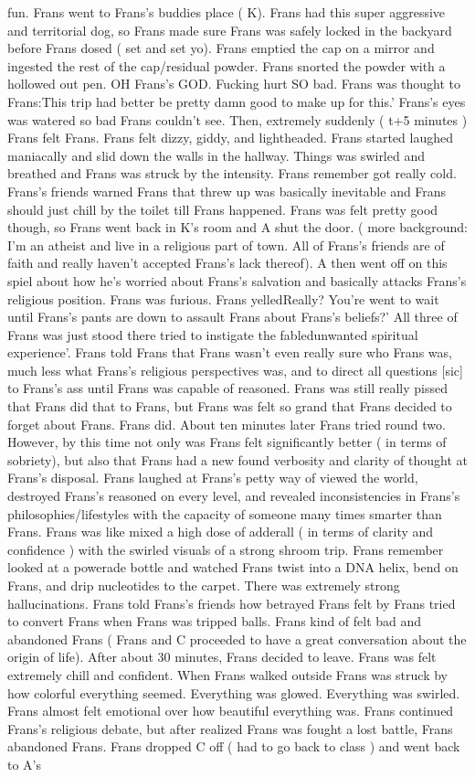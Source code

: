 \documentclass[12pt]{book}
\begin{document}
fun. Frans went to Frans's buddies place ( K). Frans had this super aggressive and territorial dog, so Frans made sure Frans was safely locked in the backyard before Frans dosed ( set and set yo). Frans emptied the cap on a mirror and ingested the rest of the cap/residual powder. Frans snorted the powder with a hollowed out pen. OH Frans's GOD. Fucking hurt SO bad. Frans was thought to Frans:This trip had better be pretty damn good to make up for this.' Frans's eyes was watered so bad Frans couldn't see. Then, extremely suddenly ( t+5 minutes ) Frans felt Frans. Frans felt dizzy, giddy, and lightheaded. Frans started laughed maniacally and slid down the walls in the hallway. Things was swirled and breathed and Frans was struck by the intensity. Frans remember got really cold. Frans's friends warned Frans that threw up was basically inevitable and Frans should just chill by the toilet till Frans happened. Frans was felt pretty good though, so Frans went back in K's room and A shut the door. ( more background: I'm an atheist and live in a religious part of town. All of Frans's friends are of faith and really haven't accepted Frans's lack thereof). A then went off on this spiel about how he's worried about Frans's salvation and basically attacks Frans's religious position. Frans was furious. Frans yelledReally? You're went to wait until Frans's pants are down to assault Frans about Frans's beliefs?' All three of Frans was just stood there tried to instigate the fabledunwanted spiritual experience'. Frans told Frans that Frans wasn't even really sure who Frans was, much less what Frans's religious perspectives was, and to direct all questions [sic] to Frans's ass until Frans was capable of reasoned. Frans was still really pissed that Frans did that to Frans, but Frans was felt so grand that Frans decided to forget about Frans. Frans did. About ten minutes later Frans tried round two. However, by this time not only was Frans felt significantly better ( in terms of sobriety), but also that Frans had a new found verbosity and clarity of thought at Frans's disposal. Frans laughed at Frans's petty way of viewed the world, destroyed Frans's reasoned on every level, and revealed inconsistencies in Frans's philosophies/lifestyles with the capacity of someone many times smarter than Frans. Frans was like mixed a high dose of adderall ( in terms of clarity and confidence ) with the swirled visuals of a strong shroom trip. Frans remember looked at a powerade bottle and watched Frans twist into a DNA helix, bend on Frans, and drip nucleotides to the carpet. There was extremely strong hallucinations. Frans told Frans's friends how betrayed Frans felt by Frans tried to convert Frans when Frans was tripped balls. Frans kind of felt bad and abandoned Frans ( Frans and C proceeded to have a great conversation about the origin of life). After about 30 minutes, Frans decided to leave. Frans was felt extremely chill and confident. When Frans walked outside Frans was struck by how colorful everything seemed. Everything was glowed. Everything was swirled. Frans almost felt emotional over how beautiful everything was. Frans continued Frans's religious debate, but after realized Frans was fought a lost battle, Frans abandoned Frans. Frans dropped C off ( had to go back to class ) and went back to A's 
\end{document}
